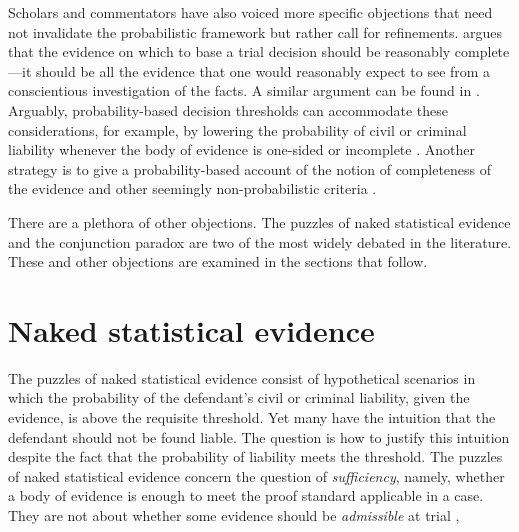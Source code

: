 \documentclass{article}
\begin{document}
 



Scholars and commentators have also voiced more specific objections that need not invalidate the probabilistic framework but rather call for  refinements.  \cite{nance2016} argues that the evidence on which to base a trial decision should be reasonably complete---it should be all the evidence that one would reasonably expect to see from a conscientious investigation of the facts. A similar argument can be found in \citep{davidsonpargetter1987}. Arguably, probability-based decision thresholds can accommodate these considerations, for example, by lowering the probability of civil or criminal liability whenever the body of evidence is one-sided or incomplete  \citep{Kaye79gate, Kaye1986Do, friedman1996}. Another strategy is to give a probability-based account of the notion of completeness of the evidence and other seemingly non-probabilistic criteria   \citep{Urbaniak2017Narration-in-ju}.

There are a plethora of other objections. The puzzles of naked statistical evidence and the conjunction paradox are two of the most widely debated in the literature. These and other objections are examined in the sections that follow.

\section{Naked statistical evidence}\label{sec:naked}



The puzzles of naked statistical evidence consist 
of hypothetical scenarios in which the probability of the defendant's 
civil or criminal liability, given the evidence, is above the requisite threshold. Yet many have the intuition that the defendant should not be found liable. The question is how to justify this intuition despite the fact that the probability of liability meets the threshold. The puzzles of naked statistical 
evidence concern the question of \textit{sufficiency}, namely, whether a body of evidence is enough to meet the proof standard applicable in a case. They are not about whether some evidence should be \textit{admissible} at trial \cite[on the distinction, see][]{picinali16}, 
%
\end{document}
